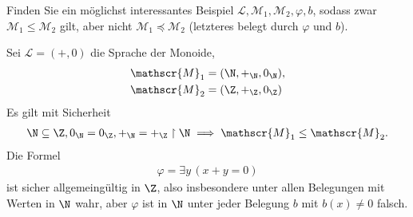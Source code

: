 
\begin{exercise}[142]
Finden Sie ein möglichst interessantes Beispiel $\mathscr{L},\mathscr{M}_1,\mathscr{M}_2,\varphi,b$,
sodass zwar $\mathscr{M}_1 \leq \mathscr{M}_2$ gilt, aber nicht $\mathscr{M}_1 \preccurlyeq \mathscr{M}_2$
(letzteres belegt durch $\varphi$ und $b$).
\end{exercise}


\begin{solution}
Sei $\mathscr{L} = (+,0)$ die Sprache der Monoide,
\begin{align*}
  \mathscr{M}_1 &= (\N,+_\N,0_\N), \\
  \mathscr{M}_2 &= (\Z,+_\Z,0_\Z)
\end{align*}
Es gilt mit Sicherheit
\begin{align*}
  \N \subseteq \Z, 0_\N = 0_\Z, +_\N = +_\Z\upharpoonright \N \implies \mathscr{M}_1 \leq \mathscr{M}_2.
\end{align*}
Die Formel
\begin{align*}
  \varphi = \exists y\,(x+y = 0)
\end{align*}
ist sicher allgemeingültig in $\Z$, also insbesondere unter allen Belegungen mit
Werten in $\N$ wahr, aber $\varphi$ ist in $\N$ unter jeder Belegung $b$ mit $b(x) \neq 0$ falsch.
\end{solution}

